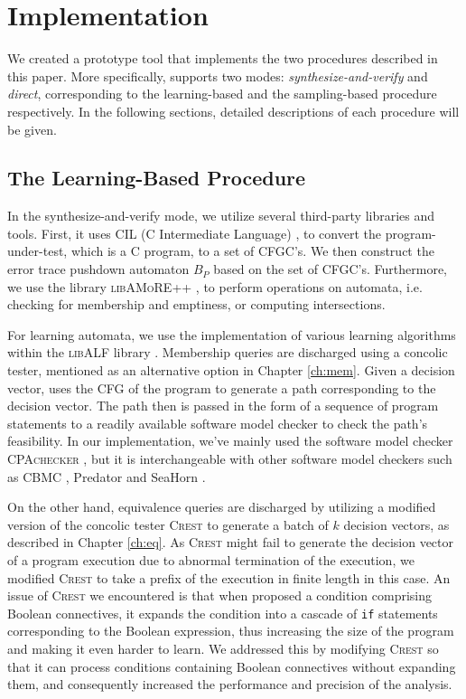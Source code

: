 \chapter{Implementation}\label{ch:implementation}

We created a prototype tool \PACMAN that implements the two procedures described in this paper. More specifically, \PACMAN supports two modes: \emph{synthesize-and-verify} and \emph{direct}, corresponding to the learning-based and the sampling-based procedure respectively. In the following sections, detailed descriptions of each procedure will be given.

\section{The Learning-Based Procedure}\label{sec:impl_learning}

In the synthesize-and-verify mode, we utilize several third-party libraries and tools. First, it uses CIL (C Intermediate Language) \cite{NeculaMRW02}, \cite{cil} to convert the program-under-test, which is a C program, to a set of CFGC's. We then construct the error trace pushdown automaton $B_P$ based on the set of CFGC's. Furthermore, we use the library \textsc{libAMoRE++} \cite{MatzMPTV95}, \cite{BolligKKLNP10} to perform operations on automata, i.e. checking for membership and emptiness, or computing intersections. 

For learning automata, we use the implementation of various learning algorithms within the \textsc{libALF} library \cite{BolligKKLNP10}. Membership queries are discharged using a concolic tester, mentioned as an alternative option in Chapter \ref{ch:mem}. Given a decision vector, \PACMAN uses the CFG of the program to generate a path corresponding to the decision vector. The path then is passed in the form of a sequence of program statements to a readily available software model checker to check the path's feasibility. In our implementation, we've mainly used the software model checker \textsc{CPAchecker} \cite{BeyerK11}, but it is interchangeable with other software model checkers such as CBMC \cite{ClarkeKL04}, Predator \cite{DudkaPV11} and SeaHorn \cite{GurfinkelKKN15}.

On the other hand, equivalence queries are discharged by utilizing a modified version of the concolic tester \textsc{Crest} \cite{BurnimS08} to generate a batch of $k$ decision vectors, as described in Chapter \ref{ch:eq}. As \textsc{Crest} might fail to generate the decision vector of a program execution due to abnormal termination of the execution, we modified \textsc{Crest} to take a prefix of the execution in finite length in this case. An issue of \textsc{Crest} we encountered is that when proposed a condition comprising Boolean connectives, it expands the condition into a cascade of \texttt{if} statements corresponding to the Boolean expression, thus increasing the size of the program and making it even harder to learn. We addressed this by modifying \textsc{Crest} so that it can process conditions containing Boolean connectives without expanding them, and consequently increased the performance and precision of the analysis. 

